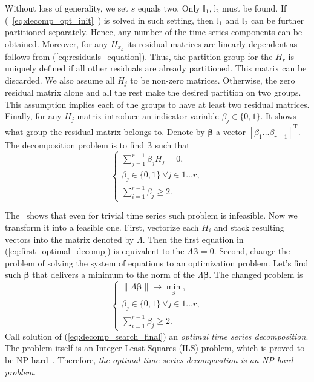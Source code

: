 \documentclass[referee, pdflatex, sn-mathphys-num]{sn-jnl}
\theoremstyle{definition}
\theoremstyle{plain}
\begin{document}
	Without loss of generality, we set $ s $ equals two. Only $ \mathbb{I}_1, \mathbb{I}_2 $ must be found. If (~\ref{eq:decomp_opt_init}~) is solved in such setting, then $ \mathbb{I}_1 $ and $ \mathbb{I}_2 $ can be further partitioned separately. Hence, any number of the time series components can be obtained. Moreover, for any $ H_{x_k} $ its residual matrices are linearly dependent as follows from (\ref{eq:residuals_equation}). Thus, the partition group for the $ H_r $ is uniquely defined if all other residuals are already partitioned. This matrix can be discarded. We also assume all $ H_j $ to be non-zero matrices. Otherwise, the zero residual matrix alone and all the rest make the desired partition on two groups. This assumption implies each of the groups to have at least two residual matrices. Finally, for any $ H_j $ matrix introduce an indicator-variable $ \beta_j \in \{0, 1\} $. It shows what group the residual matrix belongs to. Denote by $ \boldsymbol{\beta} $ a vector $ [\beta_1 \ldots \beta_{r-1}]^{\text{T}} $. The decomposition problem is to find $ \boldsymbol{\beta} $ such that \begin{equation}\label{eq:first_optimal_decomp}
		\begin{cases*}
			\sum\limits_{j = 1}^{r - 1} \beta_j H_j = 0, \\
			\beta_j \in \{0, 1\} \ \forall j \in 1 \ldots r, \\
			\sum\limits_{i = 1}^{r - 1} \beta_j \ge 2.
		\end{cases*}
	\end{equation} 
	
	The~\cite{ecfb9dc578be43ae9ee8fc88b8ff9151} shows that even for trivial time series such problem is infeasible. Now we transform it into a feasible one. First, vectorize each $ H_i $ and stack resulting vectors into the matrix denoted by $ \Lambda $. Then the first equation in (\ref{eq:first_optimal_decomp}) is equivalent to the $ \Lambda \boldsymbol{\beta} = 0 $. Second, change the problem of solving the system of equations to an optimization problem. Let's find such $ \boldsymbol{\beta} $ that delivers a minimum to the norm of the $ \Lambda \boldsymbol{\beta} $. The changed problem is \begin{equation}\label{eq:decomp_search_final}
		\begin{cases*}
			\lVert \Lambda \boldsymbol{\beta} \rVert \to \underset{\boldsymbol{\beta}}{\min}, \\
			\beta_j \in \{0, 1\} \ \forall j \in 1 \ldots r, \\
			\sum\limits_{i = 1}^{r - 1} \beta_j \ge 2.
		\end{cases*}
	\end{equation} Call solution of (\ref{eq:decomp_search_final}) an \emph{optimal time series decomposition}. The problem itself is an Integer Least Squares (ILS) problem, which is proved to be NP-hard~\cite{van1981another}. Therefore, \emph{the optimal time series decomposition is an NP-hard problem}.
	
\end{document}
